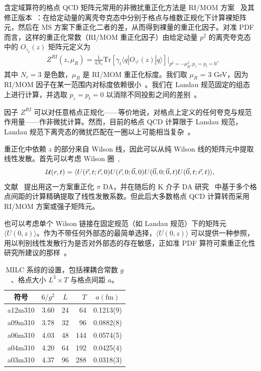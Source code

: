 含定域算符的格点 QCD 矩阵元常用的非微扰重正化方法是 RI/MOM 方案~\cite{Martinelli:1994ty} 及其修正版本~\cite{Aoki:2007xm}：在给定动量的离壳夸克态中分别于格点与维数正规化下计算裸矩阵元，然后在 $\overline{\textrm{MS}}$ 方案下重正化二者的差，从而得到裸量的重正化因子。对准 PDF 而言，这样的重正化常数（RI/MOM 重正化因子）由给定动量 $p^2$ 的离壳夸克态中的 $O_{\gamma_t}(z)$ 矩阵元定义为~\cite{Green:2017xeu,Chen:2017mzz,Alexandrou:2017huk,Stewart:2017tvs}
\begin{align}\label{eq:Z_ri}
&Z^{RI}(z,\mu_R)=\frac{1}{4N_c}\textrm{Tr}[\gamma_t\langle q|O_{\gamma^t}(z)|q\rangle]|_{p^2=-\mu_R^2,p_z=p_t=0},
\end{align}
其中 $N_c=3$ 是色数，$\mu_R$ 是 RI/MOM 重正化标度。我们取 $\mu_R$ = 3 GeV，因为 RI/MOM 因子在某一范围内对标度依赖很小~\cite{Zhang:2020rsx}。我们在 Landau 规范固定的组态上进行计算，并选取 $p_z=p_t=0$ 以消除不同投影之间的差别~\cite{Liu:2018uuj}。

因子 $Z^{RI}$ 可以对任意格点正规化——等价地说，对格点上定义的任何夸克与规范作用量——作非微扰计算。然而，目前的格点 QCD 计算限于 Landau 规范，Landau 规范下离壳态的微扰匹配在一圈以上可能相当复杂~\cite{Chen:2020ody}。

重正化中依赖 $z$ 的部分来自 Wilson 线，因此可以从纯 Wilson 线的矩阵元中提取线性发散。首先可以考虑 Wilson 圈~\cite{Chen:2016fxx,Zhang:2017bzy,Musch:2010ka,Green:2017xeu,Chen:2017gck},
\begin{equation}
{\cal U}(r,t)=\langle U(\vec{r},t;\vec{r},0)U(\vec{r},0;\vec{0},0)U(\vec{0},0;\vec{0},t)U(\vec{0},t;\vec{r},t)\rangle ,
\end{equation}
文献~\cite{Chen:2016fxx} 提出用这一方案重正化 $\pi$ DA，并在随后的 K 介子 DA 研究~\cite{Zhang:2017bzy} 中基于多个格点间距的计算精确提取了线性发散系数。但此后大多数格点 QCD 计算转而采用 RI/MOM 方案或强子矩阵元。

也可以考虑单个 Wilson 链接在固定规范（如 Landau 规范）下的矩阵元 $\langle U(0,z)\rangle$。作为不带任何外部态的最简单选择，$\langle U(0,z)\rangle$ 可以提供一种参照，用以判别线性发散行为是否对外部态的存在敏感，正如准 PDF 算符可乘重正化性研究所建议的那样~\cite{Ji:2015jwa, Ji:2017oey,Ishikawa:2017faj,Green:2017xeu}。

\begin{table}[htbp]
  \centering
  \begin{tabular}{c|ccrc}
  \toprule
 符号 & $6/g^2$ & $L$ & $T$  & $a(\mathrm{fm})$ \\
\hline
a12m310 &  3.60 & 24 & 64  & 0.1213(9) \\
\hline
a09m310 &  3.78 & 32 & 96 & 0.0882(8)  \\
\hline
a06m310 &  4.03 & 48 & 144 & 0.0574(5) \\
\hline
a04m310 &  4.20 & 64 & 192 & 0.0425(4)  \\
\hline
a03m310 &  4.37 & 96 & 288 & 0.0318(3) \\
\hline
  \end{tabular}
  \caption{MILC 系综的设置，包括裸耦合常数 $g$、格点大小 $L^3\times T$ 与格点间距 $a$。}
  \label{tab:lattice}
\end{table}

